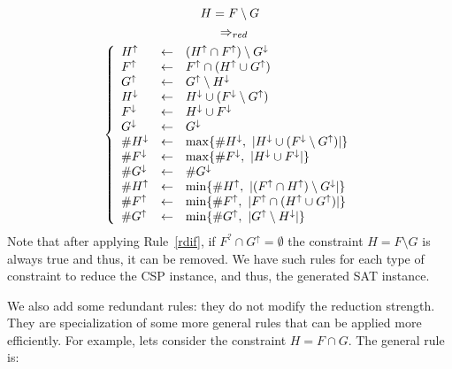 \documentclass[3p,authoryear,times]{elsarticle}
\newcommand{\card}[1]{|#1|}
\newcommand{\MS}[1]{{{#1}^{\uparrow}}}
\newcommand{\ms}[1]{{\MakeUppercase{#1}^\downarrow}}
\newcommand{\MSF}[0]{\MS{F}}
\newcommand{\msF}[0]{\ms{f}}
\newcommand{\msFb}[0]{{F^{?}}}
\newcommand{\MSG}[0]{\MS{G}}
\newcommand{\msG}[0]{\ms{g}}
\newcommand{\MSH}[0]{\MS{H}}
\newcommand{\msH}[0]{\ms{h}}
\newcommand{\MC}[1]{{\#{#1}^\uparrow{}}}
\newcommand{\mc}[1]{{\#{#1}^\downarrow}}
\newcommand{\MCF}[0]{\MC{F}{}}
\newcommand{\mcF}[0]{\mc{F}{}}
\newcommand{\MCG}[0]{\MC{G}}
\newcommand{\mcG}[0]{\mc{G}}
\newcommand{\MCH}[0]{\MC{H}}
\newcommand{\mcH}[0]{\mc{H}}
\newcommand{\C}[1]{\card{#1}}
\newcommand{\rmin}[0]{{\Rightarrow_{red}}}
\newcommand{\la}[0]{\leftarrow}
\begin{document}
\begin{gather} 
H =  F \setminus G \nonumber \\
~~ \rmin  \label{rdif} \\
     \left\lbrace
     \begin{array}{lll}
     \MSH & \la & (\MSH \cap \MSF) \setminus \msG  \\
     \MSF & \la & \MSF \cap (\MSH \cup \MSG )\\
     \MSG & \la & \MSG   \setminus \msH \\
     \msH & \la &  \msH \cup (\msF \setminus \MSG)  \\
     \msF & \la &  \msH \cup \msF \\
     \msG & \la &  \msG  \\
     \mcH & \la &  \max\{\mcH,~\C{ \msH \cup (\msF \setminus \MSG)}\}\\
     \mcF & \la &  \max\{\mcF,~ \C{\msH \cup \msF} \}\\
     \mcG & \la &  \mcG\\
     \MCH & \la &  \min\{\MCH,~ \C{(\MSF \cap \MSH) \setminus \msG} \}\\
     \MCF & \la &  \min\{ \MCF,~\C{\MSF \cap (\MSH \cup \MSG)}\}\\
     \MCG & \la &  \min\{ \MCG,~\C{\MSG   \setminus \msH}\}\\
     \end{array}
     \right. \nonumber 
\end{gather}
Note that after applying Rule~\ref{rdif}, if $\msFb \cap \MSG = \emptyset$  the constraint $H =  F \setminus G$ is always true and thus, it can be removed. We have such rules for each type of constraint to reduce the CSP instance, and thus, the generated SAT instance.










\medskip

We also add some redundant rules: they do not modify the reduction strength. They are specialization of some more general rules that can be applied more efficiently. For example, lets consider the constraint $H=F \cap G$. The general rule is:
\end{document}

